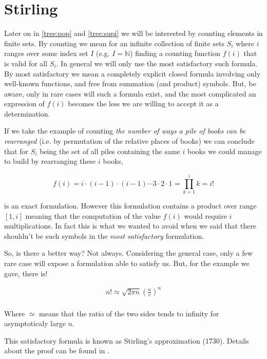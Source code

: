 \section{Stirling}
\label{tree:sorting:stirling}

Later on in \ref{tree:pop} and \ref{tree:supi} we will be interested by counting elements in finite sets. By counting we mean for an infinite collection of finite sets $S_i$ where $i$ ranges over some index set $I$ (e.g. $I = \mathbb{N}$) finding a counting function $f(i)$ that is valid for all $S_i$. In general we will only use the most satisfactory such formula. By most satisfactory we mean a completely explicit closed formula involving only well-known functions, and free from summation (and product) symbols. But, be aware, only in rare cases will such a formula exist, and the most complicated an expression of $f(i)$ becomes the less we are willing to accept it as a determination. \cite{Stanley:2011:ECV:2124415}

If we take the example of counting \emph{the number of ways a pile of books can be rearranged} (i.e. by permutation of the relative places of books) we can conclude that for $S_i$ being the set of all piles containing the same $i$ books we could manage to build by rearranging these $i$ books,

$$ f(i) = i \cdot (i-1) \cdot (i-1) \cdots 3 \cdot 2 \cdot 1 = \prod_{k=1}^i k = i! $$

is an exact formulation. However this formulation contains a product over range $[1, i]$ meaning that the computation of the value $f(i)$ would require $i$ multiplications. In fact this is what we wanted to avoid when we said that there shouldn't be such symbols in the \emph{most satisfactory} formulation.

So, is there a better way? Not always. Considering the general case, only a few rare case will expose a formulation able to satisfy us. But, for the example we gave, there is!


\begin{theorem}
\label{tree:sorting:theorem/stirling}
\begin{align*}
n! \simeq \sqrt{2 \pi n} \left(\frac{n}{e}\right)^n\\
\end{align*}
\end{theorem}


Where $\simeq$ means that the ratio of the two sides tends to infinity for asymptoticaly large $n$.

This satisfactory formula is known as Stirling's approximation (1730). Details about the proof can be found in \cite{feller1967direct}.

